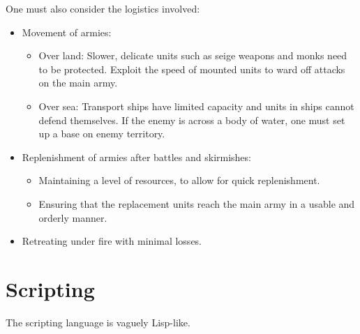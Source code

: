 \documentclass[a4paper,12pt]{article}
\begin{document}
One must also consider the logistics involved: 
\begin{itemize}
	\item Movement of armies:
	\begin{itemize}
		\item Over land:	Slower, delicate units such as seige weapons and monks need to be protected.
				Exploit the speed of mounted units to ward off attacks on the main army.
		\item Over sea:	Transport ships have limited capacity and units in ships cannot defend themselves.
				If the enemy is across a body of water, one must set up a base on enemy territory. 
	\end{itemize}
	\item Replenishment of armies after battles and skirmishes:
	\begin{itemize}
		\item Maintaining a level of resources, to allow for quick replenishment.
		\item Ensuring that the replacement units reach the main army in a usable and orderly manner.
	\end{itemize}
	\item Retreating under fire with minimal losses.
\end{itemize}

\section*{Scripting}

The scripting language is vaguely Lisp-like.
\end{document}
